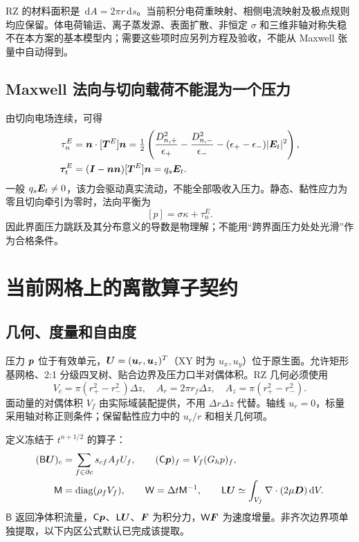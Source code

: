 \documentclass[UTF8,a4paper,11pt,fontset=fandol]{ctexart}
\numberwithin{equation}{section}
\newcommand{\dt}{\Delta t}\newcommand{\dd}{\,\mathrm d}
\newcommand{\nn}{\bm n}\newcommand{\bb}{\bm b}\newcommand{\acc}{\bm a}
\newcommand{\mat}[1]{\mathsf{#1}}\newcommand{\code}[1]{\nolinkurl{#1}}
\begin{document}
RZ 的材料面积是 $\dd A=2\pi r\dd s$。当前积分电荷重映射、相侧电流映射及极点规则均应保留。体电荷输运、离子蒸发源、表面扩散、非恒定 $\sigma$ 和三维非轴对称失稳不在本方案的基本模型内；需要这些项时应另列方程及验收，不能从 Maxwell 张量中自动得到。

\subsection{Maxwell 法向与切向载荷不能混为一个压力}
由切向电场连续，可得
\begin{align}
 \tau_n^E&=\nn\cdot[\bm T^E]\nn
 =\tfrac12\left(\frac{D_{n,+}^2}{\epsilon_+}-\frac{D_{n,-}^2}{\epsilon_-}
 -(\epsilon_+-\epsilon_-) |\EE_t|^2\right),\label{eq:tn}\\
 \bm\tau_t^E&=(\bm I-\nn\nn)[\bm T^E]\nn=q_s\EE_t.\label{eq:tt}
\end{align}
一般 $q_s\bm E_t\ne0$，该力会驱动真实流动，不能全部吸收入压力。静态、黏性应力为零且切向牵引为零时，法向平衡为
\begin{equation}\label{eq:jump}
 [p]=\sigma\kappa+\tau_n^E.
\end{equation}
因此界面压力跳跃及其分布意义的导数是物理解；不能用“跨界面压力处处光滑”作为合格条件。

\section{当前网格上的离散算子契约}
\subsection{几何、度量和自由度}
压力 $\bm p$ 位于有效单元，$\bm U=(\bm u_r,\bm u_z)^T$（XY 时为 $u_x,u_y$）位于原生面。允许矩形基网格、2:1 分级四叉树、贴合边界及压力口半对偶体积。RZ 几何必须使用
\begin{equation}
 V_c=\pi(r_+^2-r_-^2)\Delta z,\quad
 A_r=2\pi r_f\Delta z,\quad A_z=\pi(r_+^2-r_-^2).
\end{equation}
面动量的对偶体积 $V_f$ 由实际域装配提供，不用 $\Delta r\Delta z$ 代替。轴线 $u_r=0$，标量采用轴对称正则条件；保留黏性应力中的 $u_r/r$ 和相关几何项。

定义冻结于 $t^{n+1/2}$ 的算子：
\begin{align}
 (\mat B\UU)_c&=\sum_{f\in\partial c}s_{cf}A_fU_f,\qquad
 (\mat C\pp)_f=V_f(G_hp)_f,\\
 \mat M&=\operatorname{diag}(\rho_fV_f),\qquad
 \mat W=\dt\mat M^{-1},\qquad
 \mat L\UU\simeq\int_{V_f}\nabla\cdot(2\mu\bm D)\dd V.\label{eq:ops}
\end{align}
$\mat B$ 返回净体积流量，$\mat C\pp$、$\mat L\UU$、$\bm F$ 为积分力，$\mat W\FF$ 为速度增量。非齐次边界项单独提取，以下内区公式默认已完成该提取。
\end{document}
